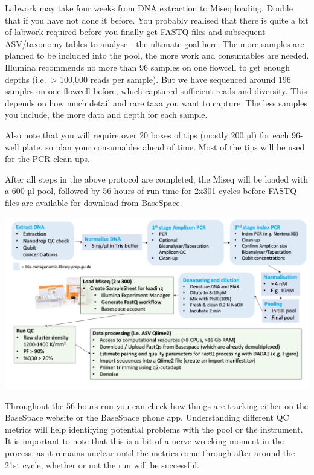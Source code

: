 \documentclass[
]{book}
\begin{document}
Labwork may take four weeks from DNA extraction to Miseq loading. Double that if you have not done it before. You probably realised that there is quite a bit of labwork required before you finally get FASTQ files and subsequent ASV/taxonomy tables to analyse - the ultimate goal here. The more samples are planned to be included into the pool, the more work and consumables are needed. Illumina recommends no more than 96 samples on one flowcell to get enough depths (i.e.~\textgreater{} 100,000 reads per sample). But we have sequenced around 196 samples on one flowcell before, which captured sufficient reads and diversity. This depends on how much detail and rare taxa you want to capture. The less samples you include, the more data and depth for each sample.

Also note that you will require over 20 boxes of tips (mostly 200 µl) for each 96-well plate, so plan your consumables ahead of time. Most of the tips will be used for the PCR clean ups.

After all steps in the above protocol are completed, the Miseq will be loaded with a 600 µl pool, followed by 56 hours of run-time for 2x301 cycles before FASTQ files are available for download from BaseSpace.

\includegraphics{./img/16s-library-prep-overview.png}

Throughout the 56 hours run you can check how things are tracking either on the BaseSpace website or the BaseSpace phone app. Understanding different QC metrics will help identifying potential problems with the pool or the instrument. It is important to note that this is a bit of a nerve-wrecking moment in the process, as it remains unclear until the metrics come through after around the 21st cycle, whether or not the run will be successful.\\
\strut \\
\strut \\
\end{document}
